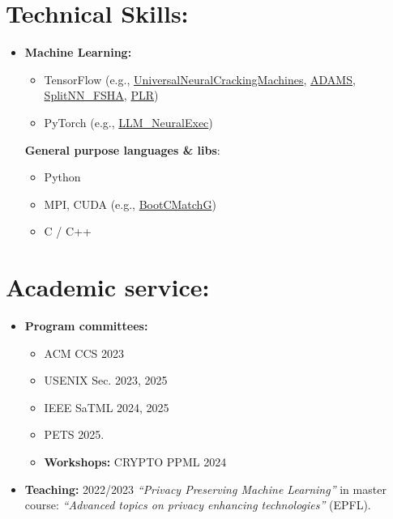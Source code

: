 \documentclass[margin, 10pt]{article} %
\begin{document}
\section*{Technical Skills:}
\fi 
\begin{itemize}
	\item  \textbf{Machine Learning:} 
	\begin{itemize}
		\item TensorFlow (e.g., \href{https://github.com/TheAdamProject/UniversalNeuralCrackingMachines}{UniversalNeuralCrackingMachines}, \href{https://github.com/TheAdamProject/adams}{ADAMS}, \href{https://github.com/pasquini-dario/SplitNN_FSHA}{SplitNN\_FSHA}, \href{https://github.com/pasquini-dario/PLR}{PLR})
		\item PyTorch (e.g., \href{https://github.com/pasquini-dario/LLM_NeuralExec}{LLM\_NeuralExec})
	\end{itemize}
	
	\textbf{General purpose languages \& libs}:
	\begin{itemize}
		\item Python
		\item MPI, CUDA (e.g., \href{https://github.com/bootcmatch/BootCMatchG/}{BootCMatchG})
		\item  C / C++
	\end{itemize}
	
\end{itemize}

\noindent\makebox[\linewidth]{\rule{.2\paperwidth}{0.3pt}}
\section*{Academic service:}  
\begin{itemize}
	\item \textbf{Program committees:}
	\begin{itemize}
		\item ACM CCS 2023
		\item USENIX Sec. 2023, 2025
		\item IEEE SaTML 2024, 2025
		\item PETS 2025.
	\end{itemize} 
	\begin{itemize}
		\item \textbf{Workshops:} CRYPTO PPML 2024
	\end{itemize}
	\item \textbf{Teaching:} 2022/2023 \textit{``Privacy Preserving Machine Learning''} in  master course: \textit{``Advanced topics on privacy enhancing technologies''} (EPFL).
\end{itemize}
\end{document}
